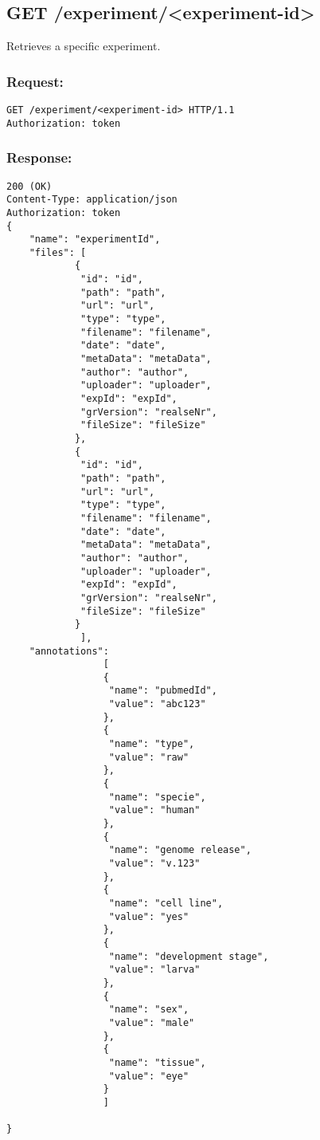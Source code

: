 \subsection*{GET /experiment/<experiment-id>}

Retrieves a specific experiment.

\subsubsection*{Request:}
\begin{verbatim}
GET /experiment/<experiment-id> HTTP/1.1
Authorization: token
\end{verbatim}

\subsubsection*{Response:}
\begin{verbatim}
200 (OK)
Content-Type: application/json
Authorization: token
{
    "name": "experimentId",
    "files": [
            { 
             "id": "id",
             "path": "path",
             "url": "url",
             "type": "type",
             "filename": "filename",
             "date": "date",
             "metaData": "metaData",
             "author": "author",
             "uploader": "uploader",
             "expId": "expId",
             "grVersion": "realseNr",
             "fileSize": "fileSize"
            },
            { 
             "id": "id",
             "path": "path",
             "url": "url",
             "type": "type",
             "filename": "filename",
             "date": "date",
             "metaData": "metaData",
             "author": "author",
             "uploader": "uploader",
             "expId": "expId",
             "grVersion": "realseNr",
             "fileSize": "fileSize"
            }
             ],
    "annotations": 
                 [
                 {
                  "name": "pubmedId",
                  "value": "abc123"
                 }, 
                 {
                  "name": "type",
                  "value": "raw"
                 },
                 {
                  "name": "specie",
                  "value": "human"
                 },
                 {
                  "name": "genome release",
                  "value": "v.123"
                 },
                 {
                  "name": "cell line",
                  "value": "yes"
                 },
                 {
                  "name": "development stage",
                  "value": "larva"
                 },
                 {
                  "name": "sex",
                  "value": "male"
                 },
                 {
                  "name": "tissue",
                  "value": "eye"
                 }
                 ]

}
\end{verbatim}


